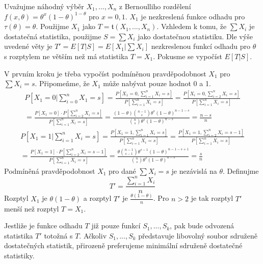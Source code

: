 \begin{example}
Uvažujme náhodný výběr $X_1, ..., X_n$ z Bernoulliho rozdělení $f(x, \theta) = \theta^x(1 - \theta)^{1 - \theta}$ pro $x = 0, 1$. $X_1$ je nezkreslená funkce odhadu pro $\tau(\theta) = \theta$. Použijme $X_1$ jako $T = \mathfrak{t}(X_1, ..., X_n)$. Vzhledem k tomu, že $\sum X_i$ je dostatečná statistika, použijme $S = \sum X_i$ jako dostatečnou statistiku. Dle výše uvedené věty je $T' = E[T|S] = E[X_1|\sum X_i]$ nezkreslenou funkcí odhadu pro $\theta$ s rozptylem ne větším než má statistika $T = X_1$. Pokusme se vypočíst $E[T|S]$.

V prvním kroku je třeba vypočíst podmíněnou pravděpodobnost $X_1$ pro $\sum X_i = s$. Připomeňme, že $X_1$ může nabývat pouze hodnot 0 a 1.
\begin{gather*}
P[X_1 = 0 | \sum_{i = 0}^n X_1 = s] = \frac{P\left[X_1 = 0, \sum_{i = 1}^n X_i = s\right]}{P\left[\sum_{i = 1}^n X_i = s\right]} = \frac{P\left[X_i = 0, \sum_{i = 2}^n X_i = s\right]}{P\left[\sum_{i = 1}^n X_i = s\right]}\\
= \frac{P[X_1 = 0] \cdot P\left[\sum_{i = 2}^n X_i = s \right]}{P\left[\sum_{i = 1}^n X_i = s\right]} = \frac{(1 -\theta)\binom{n - 1}{s}\theta^s(1 - \theta)^{n - 1 - s}}{\binom{n}{s}\theta^s(1 - \theta)^{n - s}} = \frac{n - s}{n}
\end{gather*}
\begin{gather*}
P\left[X_1 = 1 | \sum_{i = 1}^n X_i = s \right] = \frac{P\left[X_1 = 1, \sum_{i = 1}^n X_i = s \right]}{P\left[\sum_{i = 1}^n X_i = s \right]} = \frac{P\left[X_1 = 1, \sum_{i = 2}^n X_i = s - 1\right]}{P\left[\sum_{i = 1}^n X_i = s \right]}\\
= \frac{P[X_1 = 1]\cdot P\left[\sum_{i = 2}^n X_i = s - 1 \right]}{P\left[\sum_{i = 1}^n X_i = s \right]} = \frac{\theta \binom{n - 1}{s - 1}\theta^{s - 1}(1 - \theta)^{n - 1 - s + 1}}{\binom{n}{s}\theta^s(1 - \theta)^{n - s}} = \frac{s}{n}
\end{gather*}
Podmíněná pravděpodobnost $X_1$ pro dané $\sum X_i = s$ je nezávislá na $\theta$. Definujme
\begin{equation*}
T' = \frac{\sum_{i = 1}^n X_i}{n}
\end{equation*}
Rozptyl $X_1$ je $\theta(1 - \theta)$ a rozptyl $T'$ je $\frac{\theta(1 - \theta)}{n}$. Pro $n > 2$ je tak rozptyl $T'$ menší než rozptyl $T = X_1$.
\end{example}

Jestliže je funkce odhadu $T$ již pouze funkcí $S_1, ..., S_k$, pak bude odvozená statistika $T'$ totožná s $T$. Ačkoliv $S_1, ..., S_k$ představuje libovolný soubor sdruženě dostatečných statistik, přirozeně preferujeme minimální sdruženě dostatečné statistiky.

